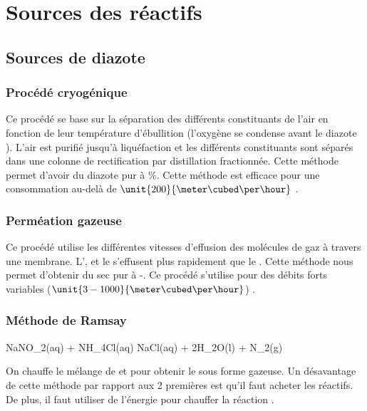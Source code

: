 \section{Sources des réactifs}
	\subsection{Sources de diazote}
	\subsubsection{Procédé cryogénique}
	Ce procédé se base sur la séparation des différents constituants de 
	l'air en fonction de leur température 
	d'ébullition (l'oxygène  se condense avant le diazote ).
	L'air est purifié jusqu'à liquéfaction et les différents constituants 
	sont séparés dans une colonne de 
	rectification par distillation fractionnée. Cette méthode permet d'avoir
	du diazote  pur 
	à \%. Cette méthode est efficace pour une consommation
	au-delà de $\unit{200}{\meter\cubed\per\hour}$ \cite{scf}. 

	\subsubsection{Perméation gazeuse}
	Ce procédé utilise les différentes vitesses d'effusion des molécules 
	de gaz à travers une membrane. 
	L',  et le  s'effusent 
	plus rapidement que le .
	Cette méthode nous permet d'obtenir du  sec pur à 
	-. Ce procédé s'utilise pour des 
	débits forts variables ($\unit{3-1000}{\meter\cubed\per\hour}$) \cite{scf}.

	\subsubsection{Méthode de Ramsay}
	
	\begin{chemmath}
			NaNO_2(aq) + NH_4Cl(aq) \longrightarrow NaCl(aq) + 2H_2O(l) + N_2(g)
	\end{chemmath}
	
	On chauffe le mélange de  et  pour 
	obtenir le  sous forme gazeuse.
	Un désavantage de cette méthode par rapport aux 2 premières est qu'il 
	faut acheter les réactifs. De plus, il faut utiliser de l'énergie pour 
	chauffer la réaction \cite{wiki-n2}.

